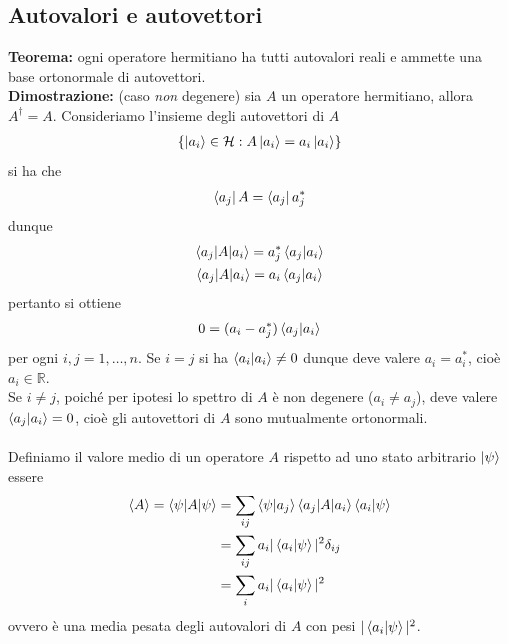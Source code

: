 \documentclass{article}
\begin{document}
\newpage
\subsection{Autovalori e autovettori}
\textbf{Teorema:} ogni operatore hermitiano ha tutti autovalori reali e ammette una base ortonormale di autovettori. \\

\textbf{Dimostrazione:} (caso \textit{non} degenere) sia $A$ un operatore hermitiano, allora $A^\dagger = A$. Consideriamo l'insieme degli autovettori di $A$
\begin{gather}
    \left\{ \ket{a_i} \in \mathcal{H} : A\ket{a_i} = a_i \ket{a_i} \right\} \notag
\end{gather}
si ha che
\begin{gather}
    \bra{a_j}A = \bra{a_j} a_j^* \notag
\end{gather}
dunque
\begin{gather}
    \braket{a_j | A | a_i} = a_j^* \braket{a_j | a_i} \notag \\
    \braket{a_j | A | a_i} = a_i \braket{a_j | a_i} \notag
\end{gather}
pertanto si ottiene
\begin{gather}
    0 = (a_i - a_j^*)\braket{a_j | a_i} \notag
\end{gather}
per ogni $i, j = 1, \dots, n$. Se $i = j$ si ha $\braket{a_i | a_i} \neq 0$ dunque deve valere $a_i = a_i^*$, cioè $a_i \in \mathbb{R}$. \\
Se $i \neq j$, poiché per ipotesi lo spettro di $A$ è non degenere ($a_i \neq a_j$), deve valere $\braket{a_j | a_i} = 0$, cioè gli autovettori di $A$ sono mutualmente ortonormali. \\ \\
Definiamo il valore medio di un operatore $A$ rispetto ad uno stato arbitrario $\ket{\psi}$ essere
\begin{align}
    \braket{A} = \braket{\psi|A|\psi} &= \sum_{ij} \braket{\psi|a_j}\braket{a_j|A|a_i}\braket{a_i|\psi} \notag \\
    &= \sum_{ij}a_i|\braket{a_i|\psi}|^2\delta_{ij} \notag \\
    &= \sum_i a_i|\braket{a_i|\psi}|^2 \notag
\end{align}
ovvero è una media pesata degli autovalori di $A$ con pesi $|\braket{a_i|\psi}|^2$.
\end{document}

